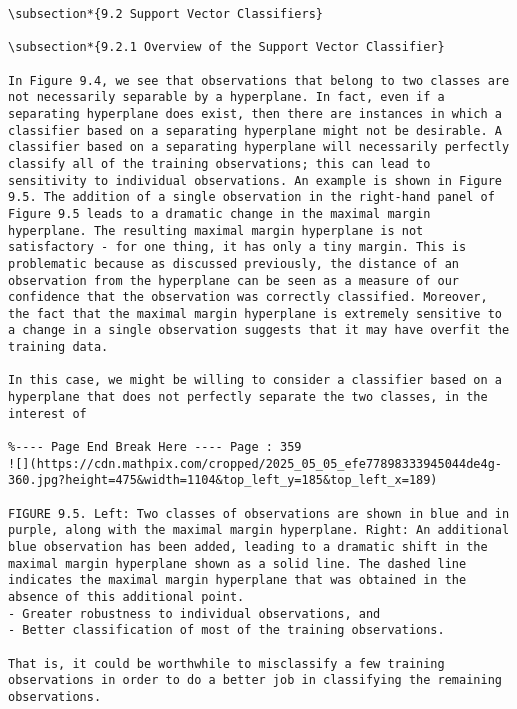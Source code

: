\documentclass[10pt]{article}
\begin{document}
\begin{verbatim}
\subsection*{9.2 Support Vector Classifiers}

\subsection*{9.2.1 Overview of the Support Vector Classifier}

In Figure 9.4, we see that observations that belong to two classes are not necessarily separable by a hyperplane. In fact, even if a separating hyperplane does exist, then there are instances in which a classifier based on a separating hyperplane might not be desirable. A classifier based on a separating hyperplane will necessarily perfectly classify all of the training observations; this can lead to sensitivity to individual observations. An example is shown in Figure 9.5. The addition of a single observation in the right-hand panel of Figure 9.5 leads to a dramatic change in the maximal margin hyperplane. The resulting maximal margin hyperplane is not satisfactory - for one thing, it has only a tiny margin. This is problematic because as discussed previously, the distance of an observation from the hyperplane can be seen as a measure of our confidence that the observation was correctly classified. Moreover, the fact that the maximal margin hyperplane is extremely sensitive to a change in a single observation suggests that it may have overfit the training data.

In this case, we might be willing to consider a classifier based on a hyperplane that does not perfectly separate the two classes, in the interest of

%---- Page End Break Here ---- Page : 359
![](https://cdn.mathpix.com/cropped/2025_05_05_efe77898333945044de4g-360.jpg?height=475&width=1104&top_left_y=185&top_left_x=189)

FIGURE 9.5. Left: Two classes of observations are shown in blue and in purple, along with the maximal margin hyperplane. Right: An additional blue observation has been added, leading to a dramatic shift in the maximal margin hyperplane shown as a solid line. The dashed line indicates the maximal margin hyperplane that was obtained in the absence of this additional point.
- Greater robustness to individual observations, and
- Better classification of most of the training observations.

That is, it could be worthwhile to misclassify a few training observations in order to do a better job in classifying the remaining observations.


\end{verbatim}
\end{document}
